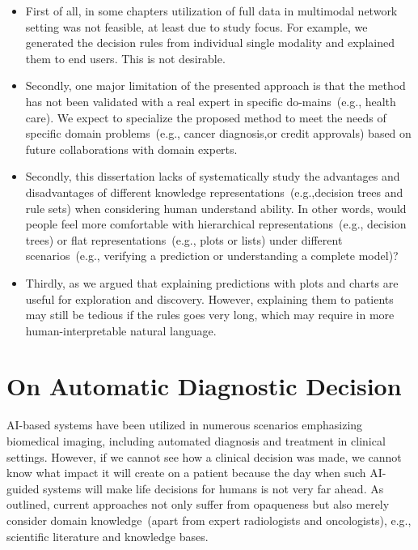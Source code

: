 \begin{itemize}[noitemsep]
    \item First of all, in some chapters utilization of full data in multimodal network setting was not feasible, at least due to study focus. For example, we generated the decision rules from individual single modality and explained them to end users. This is not desirable. 
    \item Secondly, one major limitation of the presented approach is that the method has not been validated with a real expert in specific do-mains~(e.g., health care). We expect to specialize the proposed method to meet the needs of specific domain problems~(e.g., cancer diagnosis,or credit approvals) based on future collaborations with domain experts. 
    \item Secondly, this dissertation lacks of systematically study the advantages and disadvantages of different knowledge representations~(e.g.,decision trees and rule sets) when considering human understand ability. In other words, would people feel more comfortable with hierarchical representations~(e.g., decision trees) or flat representations~(e.g., plots or lists) under different scenarios~(e.g., verifying a prediction or understanding a complete model)?
    \item Thirdly, as we argued that explaining predictions with plots and charts are useful for exploration and discovery\cite{KarimIEEEAccess2019}. However, explaining them to patients may still be tedious if the rules goes very long, which may require in more human-interpretable natural language. 
\end{itemize}


\section{On Automatic Diagnostic Decision}
AI-based systems have been utilized in numerous scenarios emphasizing biomedical imaging, including automated diagnosis and treatment in clinical settings. However, if we cannot see how a clinical decision was made, we cannot know what impact it will create on a patient because the day when such AI-guided systems will make life decisions for humans is not very far ahead. As outlined, current approaches not only suffer from opaqueness but also merely consider domain knowledge~(apart from expert radiologists and oncologists), e.g., scientific literature and knowledge bases. 

